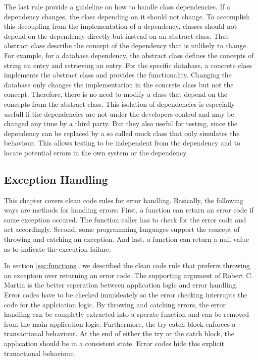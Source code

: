The last rule provide a guideline on how to handle class dependencies. If a dependency changes, the class depending on it should not change. To accomplish this decoupling from the implementation of a dependency, classes should not depend on the dependency directly but instead on an abstract class. That abstract class describe the concept of the dependency that is unlikely to change. For example, for a database dependency, the abstract class defines the concepts of string an entry and retrieving an entry. For the specific database, a concrete class implements the abstract class and provides the functionality. Changing the database only changes the implementation in the concrete class but not the concept. Therefore, there is no need to modify a class that depend on the concepts from the abstract class. This isolation of dependencies is especially usefull if the dependencies are not under the developers control and may be changed any time by a third party. But they also useful for testing, since the dependency can be replaced by a so called mock class that only simulates the behaviour. This allows testing to be independent from the dependency and to locate potential errors in the own system or the dependency.

\subsection{Exception Handling}\label{sec:background:returning_none_and_error_handling}
This chapter covers clean code rules for error handling. Basically, the following ways are methods for handling errors:
First, a function can return an error code if some exception occured. The function caller has to check for the error code and act accordingly. Second, some programming languages support the concept of throwing and catching an exception. And last, a function can return a null value as to indicate the execution failure. 

In section \ref{sec:functions}, we described the clean code rule that preferrs throwing an exception over returning an error code. The supporting argument of Robert C. Martin is the better seperation between application logic and error handling\cite{martin_clean_2009}. Error codes have to be checked immideately so the error checking interrupts the code for the applciation logic. By throwing and catching errors, the error handling can be completly extracted into a sperate function and can be removed from the main application logic. Furthermore, the try-catch block enforces a transactional behaviour. At the end of either the try or the catch block, the application should be in a consistent state. Error codes hide this explicit tranactional behaviour. 


